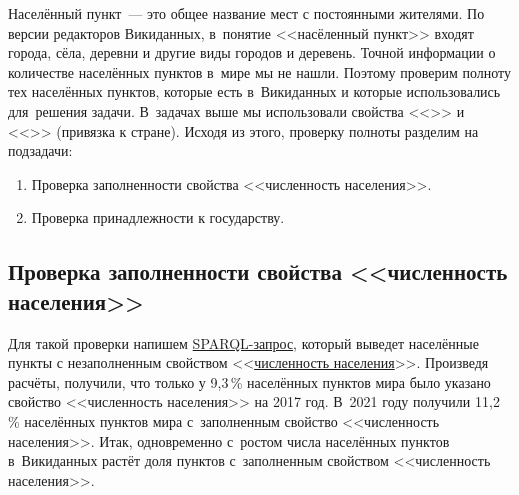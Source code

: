 Населённый пункт~--- это общее название мест с постоянными жителями. %
По версии редакторов Викиданных, в~понятие <<насёленный пункт>> входят города, сёла, деревни 
и другие виды городов и деревень. 
Точной информации о количестве населённых пунктов в~мире мы не нашли. 
Поэтому проверим полноту тех населённых пунктов, которые есть в~Викиданных 
и которые использовались для~решения задачи. 
В~задачах выше мы использовали свойства <<>> и 
<<>> (привязка к стране). 
Исходя из этого, проверку полноты разделим на подзадачи: 
\begin{enumerate} 
  \item Проверка заполненности свойства <<численность населения>>.
  \item Проверка принадлежности к государству.
\end{enumerate}


\subsection{Проверка заполненности свойства <<численность населения>> }

Для такой проверки напишем \href{https://w.wiki/4FUz}{SPARQL-запрос}, 
который выведет населённые пункты 
с незаполненным свойством <<\href{http://www.wikidata.org/entity/P1082}{численность населения}>>. 
Произведя расчёты, получили, что только у 9,3\,\% населённых пунктов мира 
было указано свойство <<численность населения>> на 2017 год. 
В~2021 году получили 11,2\,\% населённых пунктов мира с~заполненным свойство <<численность населения>>. 
Итак, одновременно с~ростом числа населённых пунктов в~Викиданных 
растёт доля пунктов с~заполненным свойством <<численность населения>>.


